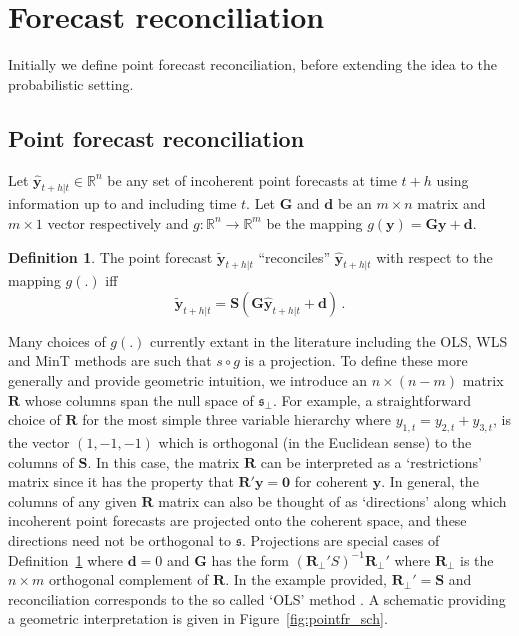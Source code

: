 \documentclass[a4paper, 11pt]{article}
\theoremstyle{theo}
\theoremstyle{definition}
\newtheorem{definition}{Definition}[section]
\begin{document}
\section{Forecast reconciliation}\label{sec:reconciliation}

Initially we define point forecast reconciliation, before extending the idea to the probabilistic setting.

\subsection{Point forecast reconciliation}


  Let $\hat{\bm{y}}_{t+h|t} \in \mathbb{R}^n$ be any set of incoherent point forecasts at time $t+h$ using information up to and including time $t$.  Let $\bm{G}$ and $\bm{d}$ be an $m\times n$ matrix and $m\times 1$ vector respectively and $g:\mathbb{R}^n \rightarrow \mathbb{R}^m$ be the mapping $g(\bm{y})={\bm G}{\bm y}+{\bm d}$.
  \begin{definition}\label{def:reconpoint}
  The point forecast $\tilde{\bm{y}}_{t+h|t}$ ``reconciles'' $\hat{\bm{y}}_{t+h|t}$ with respect to the mapping $g(.)$ iff
  \begin{equation}
    \tilde{\bm{y}}_{t+h|t}=\bm{S}\left(\bm{G}\hat{\bm{y}}_{t+h|t}+{\bm d}\right)\,.
  \end{equation} 
    
\end{definition}

Many choices of $g(.)$ currently extant in the literature including the OLS, WLS and MinT methods are such that $s\circ g$ is a projection.  To define these more generally and provide geometric intuition, we introduce an $n \times (n-m)$ matrix $\bm{R}$ whose columns span the null space of $\mathfrak{s}_{\perp}$.  For example, a straightforward choice of $\bm{R}$ for the most simple three variable hierarchy where $y_{1,t}=y_{2,t}+y_{3,t}$, is the vector $(1,-1,-1)$ which is orthogonal (in the Euclidean sense) to the columns of $\bm{S}$.  In this case, the matrix $\bm{R}$ can be interpreted as a `restrictions' matrix since it has the property that $\bm{R}'\bm{y}=\bm{0}$ for coherent $\bm{y}$. In general, the columns of any given $\bm{R}$ matrix can also be thought of as `directions' along which incoherent point forecasts are projected onto the coherent space, and these directions need not be orthogonal to $\mathfrak{s}$.  Projections are special cases of Definition~\ref{def:reconpoint} where ${\bm d=0}$ and ${\bm G}$ has the form $\left({\bm R}_\perp'{S}\right)^{-1}{\bm R}_\perp'$ where ${\bm R}_\perp$ is the $n\times m$ orthogonal complement of ${\bm R}$.  In the example provided, ${\bm R}_\perp'={\bm S}$ and reconciliation corresponds to the so called `OLS' method \cite{Hyndman2011}.  A schematic providing a geometric interpretation is given in Figure~\ref{fig:pointfr_sch}. 
\end{document}
